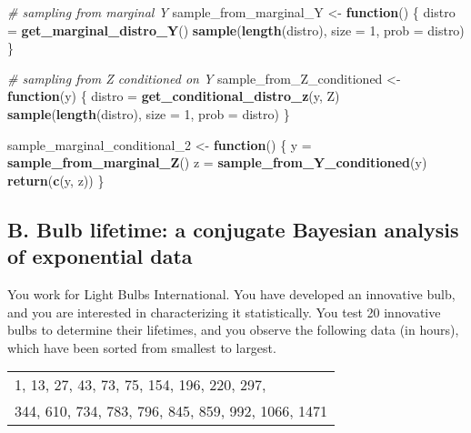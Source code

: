 \documentclass[
]{article}
\newenvironment{Shaded}{\begin{snugshade}}{\end{snugshade}}
\newcommand{\AttributeTok}[1]{\textcolor[rgb]{0.13,0.29,0.53}{#1}}
\newcommand{\CommentTok}[1]{\textcolor[rgb]{0.56,0.35,0.01}{\textit{#1}}}
\newcommand{\ControlFlowTok}[1]{\textcolor[rgb]{0.13,0.29,0.53}{\textbf{#1}}}
\newcommand{\DecValTok}[1]{\textcolor[rgb]{0.00,0.00,0.81}{#1}}
\newcommand{\FunctionTok}[1]{\textcolor[rgb]{0.13,0.29,0.53}{\textbf{#1}}}
\newcommand{\NormalTok}[1]{#1}
\newcommand{\OtherTok}[1]{\textcolor[rgb]{0.56,0.35,0.01}{#1}}
\begin{document}
\begin{Shaded}
\begin{Highlighting}[]
\CommentTok{\# sampling from marginal Y}
\NormalTok{sample\_from\_marginal\_Y }\OtherTok{\textless{}{-}} \ControlFlowTok{function}\NormalTok{() \{}
\NormalTok{    distro }\OtherTok{=} \FunctionTok{get\_marginal\_distro\_Y}\NormalTok{()}
    \FunctionTok{sample}\NormalTok{(}\FunctionTok{length}\NormalTok{(distro), }\AttributeTok{size =} \DecValTok{1}\NormalTok{, }\AttributeTok{prob =}\NormalTok{ distro)}
\NormalTok{\}}

\CommentTok{\# sampling from Z conditioned on Y}
\NormalTok{sample\_from\_Z\_conditioned }\OtherTok{\textless{}{-}} \ControlFlowTok{function}\NormalTok{(y) \{}
\NormalTok{    distro }\OtherTok{=} \FunctionTok{get\_conditional\_distro\_z}\NormalTok{(y, Z)}
    \FunctionTok{sample}\NormalTok{(}\FunctionTok{length}\NormalTok{(distro), }\AttributeTok{size =} \DecValTok{1}\NormalTok{, }\AttributeTok{prob =}\NormalTok{ distro)}
\NormalTok{\}}

\NormalTok{sample\_marginal\_conditional\_2 }\OtherTok{\textless{}{-}} \ControlFlowTok{function}\NormalTok{() \{}
\NormalTok{    y }\OtherTok{=} \FunctionTok{sample\_from\_marginal\_Z}\NormalTok{()}
\NormalTok{    z }\OtherTok{=} \FunctionTok{sample\_from\_Y\_conditioned}\NormalTok{(y)}
    \FunctionTok{return}\NormalTok{(}\FunctionTok{c}\NormalTok{(y, z))}
\NormalTok{\}}
\end{Highlighting}
\end{Shaded}

\bigskip

\newpage

\hypertarget{b.-bulb-lifetime-a-conjugate-bayesian-analysis-of-exponential-data}{%
\subsection{B. Bulb lifetime: a conjugate Bayesian analysis of
exponential
data}\label{b.-bulb-lifetime-a-conjugate-bayesian-analysis-of-exponential-data}}

You work for Light Bulbs International. You have developed an innovative
bulb, and you are interested in characterizing it statistically. You
test 20 innovative bulbs to determine their lifetimes, and you observe
the following data (in hours), which have been sorted from smallest to
largest.

\begin{table}[!h]
\centering
\begin{tabular}{l}
1, 13, 27, 43, 73, 75, 154, 196, 220, 297,\\
344, 610, 734, 783, 796, 845, 859, 992, 1066, 1471
\end{tabular}
\end{table}
\end{document}
